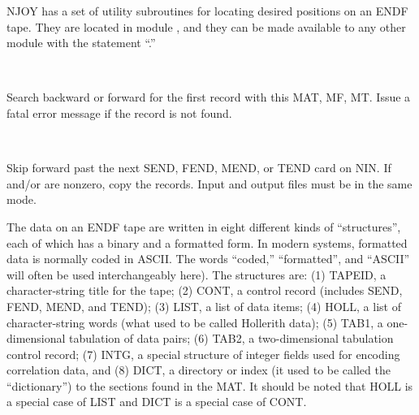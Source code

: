 NJOY has a set of utility subroutines for locating desired positions
on an ENDF tape.  They are located in module
, and they
can be made available to any other module with the statement
``.''

\begin{description}
\begin{singlespace}
\item[\cword{findf(mat,mf,mt,nin)}] ~\par
 Search  backward or forward for the first record with this
 MAT, MF, MT.  Issue a fatal error message if the record is not found.

\item[\cword{tosend(nin,nout,nscr,a)}]

\item[\cword{tofend(nin,nout,nscr,a)}]

\item[\cword{tomend(nin,nout,nscr,a)}]

\item[\cword{totend(nin,nout,nscr,a)}] ~\par
Skip forward past the next SEND, FEND, MEND, or TEND card on NIN.
If  and/or  are nonzero, copy the records.
Input and output files must be in the same mode.
\end{singlespace}
\end{description}

The data on an ENDF tape are written in eight different kinds of
``structures'', each of which has a binary and a formatted form.
In modern systems, formatted data is normally coded in ASCII.  The
words ``coded,'' ``formatted'', and ``ASCII'' will often be
used interchangeably here). The structures are:
(1) TAPEID, a character-string title
for the tape; (2) CONT, a control record
(includes SEND, FEND, MEND, and TEND); (3) LIST,
a list of data items; (4) HOLL, a list of character-string words (what
used to be called Hollerith data); (5) TAB1,
a one-dimensional tabulation of data pairs; (6) TAB2,
a two-dimensional tabulation control record; (7) INTG,
a special structure of integer fields used for encoding correlation data,
and (8) DICT, a directory or index (it used to be
called the ``dictionary'') to the sections found in the MAT.  It should
be noted that HOLL is a special case of LIST and DICT is a special
case of CONT.

